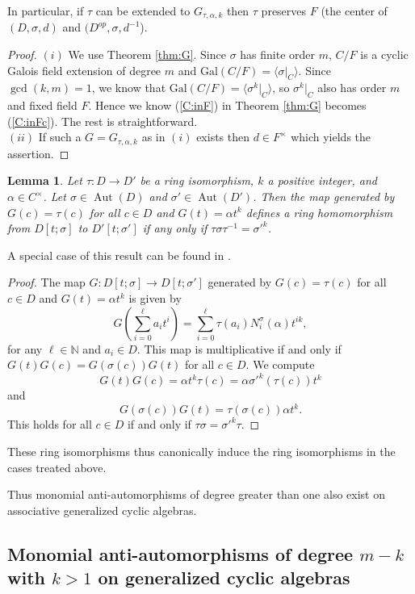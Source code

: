 \documentclass{amsart}
\theoremstyle{plain}
\newtheorem{lemma}[theorem]{Lemma}
\theoremstyle{definition}
\numberwithin{equation}{section}
\numberwithin{figure}{section}
\DeclareMathOperator{\Aut}{Aut}
\begin{document}
In particular, if $\tau$ can be extended to $G_{\tau,\alpha,k}$ then $\tau$ preserves $F$ (the center of $(D,\sigma,d)$ and $ (D^{op},\sigma,d^{-1}$).

\begin{proof}
$(i)$
We use Theorem \ref{thm:G}.
Since $\sigma$ has finite order $m$,  $C/F$ is a cyclic Galois field extension of
 degree $m$ and $\mathrm{Gal}(C/F) = \langle \sigma |_{C} \rangle$. Since $\gcd(k,m)=1$, we know that $\mathrm{Gal}(C/F) = \langle \sigma^k |_{C} \rangle$, so $\sigma^k |_{C} $ also has order $m$ and fixed field $F$. Hence we know  (\ref{C:inF}) in Theorem \ref{thm:G} becomes (\ref{C:inFc}). The rest is straightforward.
 \\ $(ii)$  If such a $G=G_{\tau,\alpha,k}$ as in $(i)$ exists then $d\in F^\times$ which yields the assertion.
\end{proof}


 \begin{lemma}\label{L:Ktsigmatoitself}
    Let $\tau:D\to D'$ be a ring isomorphism, $k$ a positive integer,  and $\alpha\in C^\times$. Let $\sigma\in \Aut(D)$ and $\sigma'\in \Aut(D')$. Then the map generated by $G(c)=\tau(c)$ for all $c\in D$ and $G(t)=\alpha t^k$ defines a ring homomorphism  from $D[t;\sigma]$ to $D'[t;\sigma']$ if any only if $\tau\sigma\tau^{-1}={\sigma'}^k$.
\end{lemma}

A special case of this result can be found in \cite[Theorem 3]{Rimmer1978}.

\begin{proof}
The map $G:D[t;\sigma]\to D[t;\sigma']$ generated by $G(c)=\tau(c)$ for all $c\in D$ and $G(t)=\alpha t^k$ is given by
$$
G(\sum_{i=0}^{\ell} a_i t^i) = \sum_{i=0}^\ell \tau(a_i) N_i^\sigma(\alpha) t^{ik},
$$
for any $\ell\in \mathbb{N}$ and $a_i\in D$.
This map
is multiplicative if and only if  $G(t)G(c)=G(\sigma(c))G(t)$ for all $c\in D$.
 We compute
$$
G(t)G(c)=\alpha t^k \tau(c) = \alpha {\sigma'}^k(\tau(c)) t^k
$$
and
$$
G(\sigma(c))G(t)=\tau(\sigma(c))\alpha t^k.
$$
This holds for all $c\in D$ if and only if $\tau\sigma={\sigma'}^k\tau$.
\end{proof}


 These ring isomorphisms thus canonically induce the ring isomorphisms in the cases treated above.


Thus monomial anti-automorphisms of degree greater than one also exist on associative generalized cyclic algebras.

\subsection{Monomial anti-automorphisms of degree $m-k$ with $k>1$ on generalized cyclic algebras}
\end{document}
